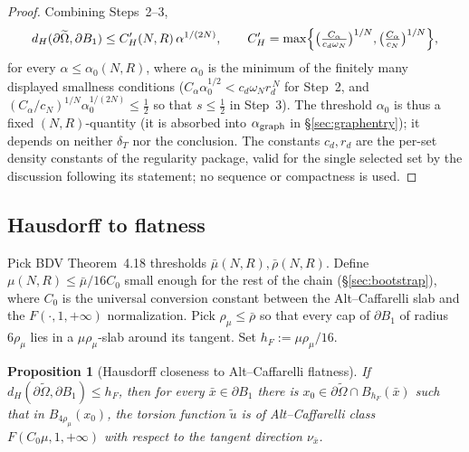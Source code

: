 \documentclass[11pt]{article}
\newtheorem{proposition}[theorem]{Proposition}
\theoremstyle{definition}
\begin{document}
\begin{proof}
Combining Steps~2--3,
\[
d_H(\partial\widetilde\Omega,\partial B_1)\le C_H'(N,R)\,\alpha^{1/(2N)},
\qquad
C_H'=\max\Bigl\{\bigl(\tfrac{C_\alpha}{c_d\omega_N}\bigr)^{1/N},
\bigl(\tfrac{C_\alpha}{c_N}\bigr)^{1/N}\Bigr\},
\]
for every $\alpha\le\alpha_0(N,R)$, where $\alpha_0$ is the minimum of the
finitely many displayed smallness conditions
($C_\alpha\alpha_0^{1/2}<c_d\omega_N r_d^{\,N}$ for Step~2, and
$(C_\alpha/c_N)^{1/N}\alpha_0^{1/(2N)}\le\tfrac12$ so that $s\le\tfrac12$ in
Step~3). The threshold $\alpha_0$ is thus a fixed $(N,R)$-quantity (it is
absorbed into $\alpha_{\rm graph}$ in \S\ref{sec:graphentry}); it depends on
neither $\delta_T$ nor the conclusion.
The constants $c_d,r_d$ are the per-set density constants of the regularity
package, valid for the single selected set by the discussion following its
statement; no sequence or compactness is used.
\end{proof}

\subsection{Hausdorff to flatness}

Pick BDV Theorem~4.18 thresholds $\bar\mu(N,R),\bar\rho(N,R)$. Define
$\mu(N,R)\le\bar\mu/16C_0$ small enough for the rest of the chain
(\S\ref{sec:bootstrap}), where $C_0$ is the universal conversion constant
between the Alt--Caffarelli slab and the $F(\cdot,1,+\infty)$ normalization.
Pick $\rho_\mu\le\bar\rho$ so that every cap of $\partial B_1$ of radius
$6\rho_\mu$ lies in a $\mu\rho_\mu$-slab around its tangent. Set
$h_F:=\mu\rho_\mu/16$.

\begin{proposition}[Hausdorff closeness to Alt--Caffarelli flatness]\label{prop:flatness}
If $d_H(\partial\widetilde\Omega,\partial B_1)\le h_F$, then for every
$\bar x\in\partial B_1$ there is $x_0\in\partial\widetilde\Omega\cap B_{h_F}(\bar x)$
such that in $B_{4\rho_\mu}(x_0)$, the torsion function $\widetilde u$ is of
Alt--Caffarelli class $F(C_0\mu,1,+\infty)$ with respect to the tangent
direction $\nu_{\bar x}$.
\end{proposition}
\end{document}

